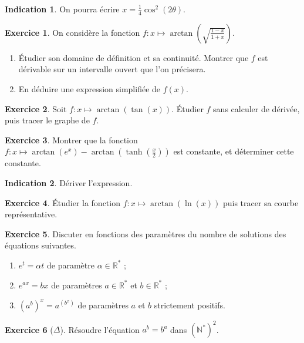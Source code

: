 \documentclass[french]{book}
\newcommand{\N}{\mathbb{N}}
\newcommand{\R}{\mathbb{R}}
\newcommand{\st}{^*}
\theoremstyle{definition}
\newtheorem{ex}{Exercice}[chapter]
\theoremstyle{theorem}
\newtheorem*{ind}{Indication}
\theoremstyle{remark}
\begin{document}
\begin{ind}
	On pourra écrire $x=\displaystyle\frac{1}{4}\cos^2(2\theta)$.
\end{ind}

\begin{ex}
	On considère la fonction $\displaystyle f:x\mapsto\arctan\left(\sqrt{\frac{1-x}{1+x}}\right)$.
	\begin{enumerate}
		\item Étudier son domaine de définition et sa continuité. Montrer que $f$ est dérivable sur un intervalle ouvert que l'on précisera.
		\item En déduire une expression simplifiée de $f(x)$.
	\end{enumerate}
\end{ex}

\begin{ex}
	Soit $f:x\mapsto\arctan(\tan(x))$. Étudier $f$ sans calculer de dérivée, puis tracer le graphe de $f$.
\end{ex}

\begin{ex}
	Montrer que la fonction $\displaystyle f:x\mapsto\arctan(e^x)-\arctan\left(\tanh\left(\frac{x}{2}\right)\right)$ est constante, et déterminer cette constante.
\end{ex}

\begin{ind}
	Dériver l'expression.
\end{ind}

\begin{ex}
	Étudier la fonction $f:x\mapsto\arctan(\ln(x))$ puis tracer sa courbe représentative.
\end{ex}

\begin{ex}
	Discuter en fonctions des paramètres du nombre de solutions des équations suivantes.
	\begin{enumerate}
		\item $e^t=\alpha t$ de paramètre $\alpha\in\R\st$ ;
		\item $e^{ax}=bx$ de paramètres $a\in\R\st$ et $b\in\R\st$ ;
		\item $(a^b)^x=a^{(b^x)}$ de paramètres $a$ et $b$ strictement positifs.
	\end{enumerate}
\end{ex}

\begin{ex}[$\Delta$]
	Résoudre l'équation $a^b=b^a$ dans $(\N\st)^2$.
\end{ex}
\end{document}
